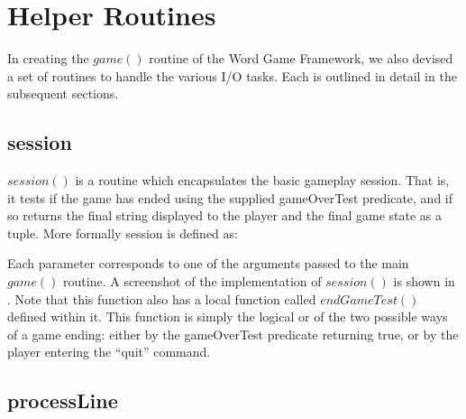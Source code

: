 
\label{chapter:wgfHelpers}

\section{Helper Routines}
\label{wordGameHelper}
In creating the \(game()\) routine of the Word Game Framework, we also devised a set of routines to handle the various I/O tasks.  Each is outlined in detail in the subsequent sections.

\subsection{session}

\(session()\) is a routine which encapsulates the basic gameplay session.  That is, it tests if the game has ended using the supplied gameOverTest predicate, and if so returns the final string displayed to the player and the final game state as a tuple.  More formally session is defined as:


Each parameter corresponds to one of the arguments passed to the main \(game()\) routine.  A screenshot of the implementation of \(session()\) is shown in .  Note that this function also has a local function called \(endGameTest()\) defined within it.  This function is simply the logical or of the two possible ways of a game ending: either by the gameOverTest predicate returning true, or by the player entering the ``quit'' command.


\subsection{processLine}

